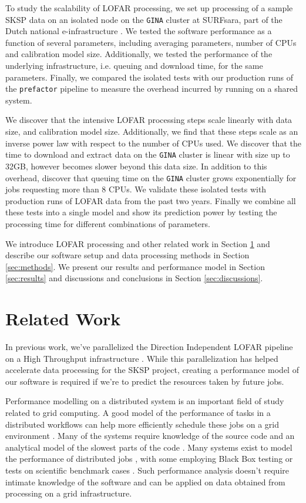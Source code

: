 \documentclass[preprint,5p]{elsarticle}
\begin{document}
To study the scalability of LOFAR processing, we set up processing of a sample SKSP data on an isolated node on the \texttt{GINA} cluster at SURFsara, part of the Dutch national e-infrastructure \citep{dutch_einfra}. We tested the software performance as a function of several parameters, including averaging parameters, number of CPUs and calibration model size. Additionally, we tested the performance of the underlying infrastructure, i.e. queuing  and download time, for the same parameters. Finally, we compared the isolated tests with our production runs of the \texttt{prefactor} pipeline to measure the overhead incurred by running on a shared system. 

We discover that the intensive LOFAR processing steps scale linearly with data size, and calibration model size. Additionally, we find that these steps scale as an inverse power law with respect to the number of CPUs used. We discover that the time to download and extract data on the \texttt{GINA} cluster is linear with size up to 32GB, however becomes slower beyond this data size. In addition to this overhead, discover that queuing time on the \texttt{GINA} cluster grows exponentially for jobs requesting more than 8 CPUs. We validate these isolated tests with production runs of LOFAR data from the past two years.  Finally we combine all these tests into a single model and show its prediction power by testing the processing time for different combinations of parameters. 

We introduce LOFAR processing and other related work in Section \ref{sec:related} and describe our software setup and data processing methods in Section \ref{sec:methods}. We present our results and performance model in Section \ref{sec:results} and  discussions and conclusions in Section \ref{sec:discussions}. 


\section{Related Work}\label{sec:related}
In previous work, we've parallelized the Direction Independent LOFAR pipeline on a High Throughput infrastructure \citep{mechev17}. While this parallelization has helped accelerate data processing for the SKSP project, creating a performance model of our software is required if we're to predict the resources taken by future jobs. 

Performance modelling on a distributed system is an important field of study related to grid computing. A good model of the performance of tasks in a distributed workflows can help more efficiently schedule these jobs on a grid environment \citep{grid_perform_model}. Many of the systems require knowledge of the source code and an analytical model of the slowest parts of the code \citep{semi_analytical_model}. Many systems exist to model the performance of distributed jobs \citep{barnes2008regression, semi_analytical_model,performance_prediction,Witt2018PredictivePM}, with some employing Black Box testing \citep{cross_platform_black_box, mapreduce_analysis} or tests on scientific benchmark cases \citep{synthetic_memory_prediction}. Such performance analysis doesn't require intimate knowledge of the software and can be applied on data obtained from processing on a grid infrastructure.
\end{document}
